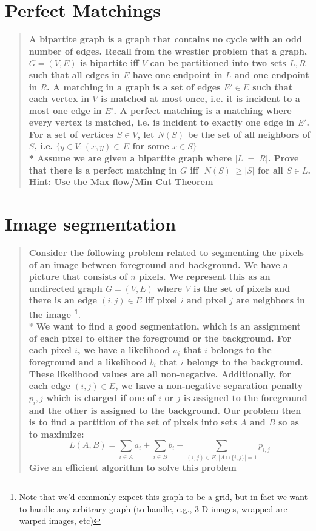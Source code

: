 \documentclass[titlepage]{article}\usepackage[]{graphicx}\usepackage[]{color}
\begin{document}
\section{Perfect Matchings}
  \begin{quote}
      \textbf{A bipartite graph is a graph that contains no cycle with an odd
      number of edges. Recall from the wrestler problem that a graph, $G = (V,
      E)$ is
    bipartite iff $V$ can be partitioned into two sets $L, R$ such that all
    edges in $E$
    have one endpoint in $L$ and one endpoint in $R$. A matching in a graph is a set of
    edges $E' \in E$ such that each vertex in $V$ is matched at most once, i.e. it is
    incident to a most one edge in $E'$. A perfect matching is a matching where every
    vertex is matched, i.e. is incident to exactly one edge in $E'$. For a set of
    vertices $S \in V$, let $N(S)$ be the set of all neighbors of $S$, i.e. $\{y
    \in V : (x,y) \in \, E $ for some $x \in S\}$ \\*
    Assume we are given a bipartite graph where $|L| = |R|$. Prove that there is a
    perfect matching in $G$ iff $|N(S)| \geq |S|$ for all $S \in L$.
    Hint: Use the Max flow/Min Cut Theorem}
  \end{quote}




\section{Image segmentation}
  \begin{quote}
    \textbf{Consider the following problem related to segmenting the pixels
      of an image between foreground and background. We have a picture that
      consists of $n$ pixels. We represent this as an undirected graph $G =
      (V,E)$ where $V$ is the set of pixels and there is an edge $(i,j) \in
      E$ iff pixel $i$ and pixel $j$ are neighbors in the image
      \footnote{Note that we’d commonly expect this graph to be a grid, but
        in fact we want to handle any arbitrary graph (to handle, e.g., 3-D
      images, wrapped are warped images, etc)}}. \\* \textbf{We want to find
        a good segmentation, which is an assignment of each pixel to either
        the foreground or the background.  For each pixel $i$, we have a
        likelihood $a_i$ that $i$ belongs to the foreground and a likelihood
        $b_i$ that $i$ belongs to the background. These likelihood values are
        all non-negative. Additionally, for each edge $(i, j) \in E$, we have
        a non-negative separation penalty $p_i,j$ which is charged if one of
        $i$ or $j$ is assigned to the foreground and the other is assigned to
        the background.  Our problem then is to find a partition of the set
        of pixels into sets $A$ and $B$ so as to maximize:}
    \[ L(A, B) = \sum_{i \in A}  a_i + \sum_{i \in B} b_i − \sum_{(i,j) \in E, | A \cap \{i,j\} | = 1} p_{i,j} \]
      \textbf{Give an efficient algorithm to solve this problem}
  \end{quote}
\end{document}
